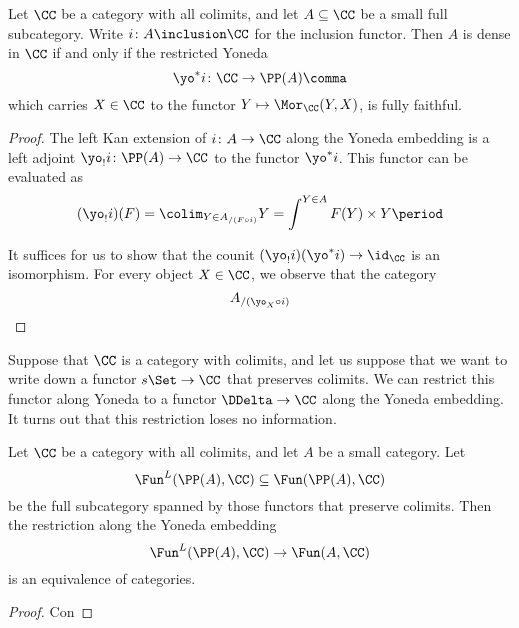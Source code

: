 \begin{proposition}
  Let $\CC$ be a category with all colimits, and let $A \subseteq \CC$ be a small full subcategory.
  Write $i \colon A \inclusion \CC$ for the inclusion functor.
  Then $A$ is dense in $\CC$ if and only if the restricted Yoneda
  \[
    \yo^{\ast} i \colon \CC \to \PP(A) \comma
  \]
  which carries $X \in \CC$ to the functor $Y \mapsto \Mor_{\CC}(Y,X)$, is fully faithful.
\end{proposition}

\begin{proof}
  The left Kan extension of $i \colon A \to \CC$ along the Yoneda embedding is a left adjoint $\yo_!i \colon \PP(A) \to \CC$ to the functor $\yo^{\ast}i$.
  This functor can be evaluated as
  \[
    (\yo_!i)(F) = \colim_{Y \in A_{/(F \circ i)}} Y = \int^{Y \in A} F(Y) \times Y \period
  \]

  It suffices for us to show that the counit $(\yo_!i)(\yo^{\ast}i) \to \id_{\CC}$ is an isomorphism.
  For every object $X \in \CC$, we observe that the category
  \[
    A_{/(\yo_X \circ i)}
  \]


\end{proof}

Suppose that $\CC$ is a category with colimits, and
let us suppose that we want to write down a functor $s\Set \to \CC$ that preserves colimits.
We can restrict this functor along Yoneda to a functor $\DDelta \to \CC$ along the Yoneda embedding.
It turns out that this restriction loses no information.

\begin{proposition}
  Let $\CC$ be a category with all colimits,
  and let $A$ be a small category.
  Let
  \[
    \Fun^L(\PP(A),\CC) \subseteq \Fun(\PP(A),\CC)
  \]
  be the full subcategory spanned by those functors that preserve colimits.
  Then the restriction along the Yoneda embedding
  \[
    \Fun^L(\PP(A),\CC) \to \Fun(A,\CC)
  \]
  is an equivalence of categories.
\end{proposition}

\begin{proof}
  Con
\end{proof}

